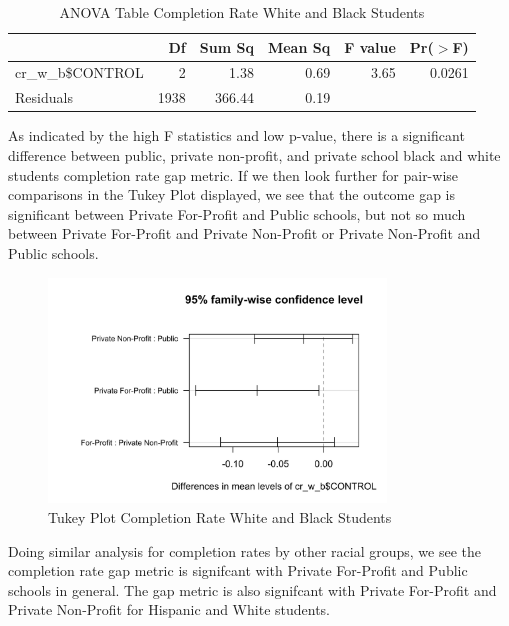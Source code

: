 \documentclass{article}
\begin{document}
\begin{table}[ht]
\centering
\begin{tabular}{lrrrrr}
  \hline
 & Df & Sum Sq & Mean Sq & F value & Pr($>$F) \\ 
  \hline
cr\_w\_b\$CONTROL & 2 & 1.38 & 0.69 & 3.65 & 0.0261 \\ 
  Residuals      & 1938 & 366.44 & 0.19 &  &  \\ 
   \hline
\end{tabular}
\caption{ANOVA Table Completion Rate White and Black Students} 
\end{table}
As indicated by the high F statistics and low p-value, there is a significant difference between public, private non-profit, and private school black and white students completion rate gap metric. If we then look further for pair-wise comparisons in the Tukey Plot displayed, we see that the outcome gap is significant between Private For-Profit and Public schools, but not so much between Private For-Profit and Private Non-Profit or Private Non-Profit and Public schools.

\begin{figure}[H]
\centering
\includegraphics[width=0.8\textwidth]{../images/completion_rate_tukeyplot_white_black.png}
\caption{\label{fig:TukeyPlot}Tukey Plot Completion Rate White and Black Students}
\end{figure}

Doing similar analysis for completion rates by other racial groups, we see the completion rate gap metric is signifcant with Private For-Profit and Public schools in general. The gap metric is also signifcant with Private For-Profit and Private Non-Profit for Hispanic and White students.
\end{document}
